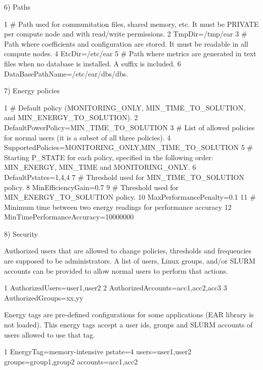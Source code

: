 6) Paths


\begin{DoxyCode}
1 # Path used for communitation files, shared memory, etc. It must be PRIVATE per compute node and with
       read/write permissions.
2 TmpDir=/tmp/ear
3 # Path where coefficients and configuration are stored. It must be readable in all compute nodes.
4 EtcDir=/etc/ear
5 # Path where metrics are generated in text files when no database is installed. A suffix is included.
6 DataBasePathName=/etc/ear/dbs/dbs.
\end{DoxyCode}


7) Energy policies


\begin{DoxyCode}
1 # Default policy (MONITORING\_ONLY, MIN\_TIME\_TO\_SOLUTION, and MIN\_ENERGY\_TO\_SOLUTION).
2 DefaultPowerPolicy=MIN\_TIME\_TO\_SOLUTION
3 # List of allowed policies for normal users (it is a subset of all three policies).
4 SupportedPolicies=MONITORING\_ONLY,MIN\_TIME\_TO\_SOLUTION
5 # Starting P\_STATE for each policy, specified in the following order: MIN\_ENERGY, MIN\_TIME and
       MONITORING\_ONLY.
6 DefaultPstates=1,4,4
7 # Threshold used for MIN\_TIME\_TO\_SOLUTION policy.
8 MinEfficiencyGain=0.7
9 # Threshold used for MIN\_ENERGY\_TO\_SOLUTION policy.
10 MaxPerformancePenalty=0.1
11 # Minimum time between two energy readings for performance accuracy
12 MinTimePerformanceAccuracy=10000000
\end{DoxyCode}


8) Security

Authorized users that are allowed to change policies, thresholds and frequencies are supposed to be administrators. A list of users, Linux groups, and/or S\+L\+U\+RM accounts can be provided to allow normal users to perform that actions.


\begin{DoxyCode}
1 AuthorizedUsers=user1,user2
2 AuthorizedAccounts=acc1,acc2,acc3
3 AuthorizedGroups=xx,yy
\end{DoxyCode}


Energy tags are pre-\/defined configurations for some applications (E\+AR library is not loaded). This energy tags accept a user ids, groups and S\+L\+U\+RM accounts of users allowed to use that tag.


\begin{DoxyCode}
1 EnergyTag=memory-intensive pstate=4 users=user1,user2 groups=group1,group2 accounts=acc1,acc2
\end{DoxyCode}


